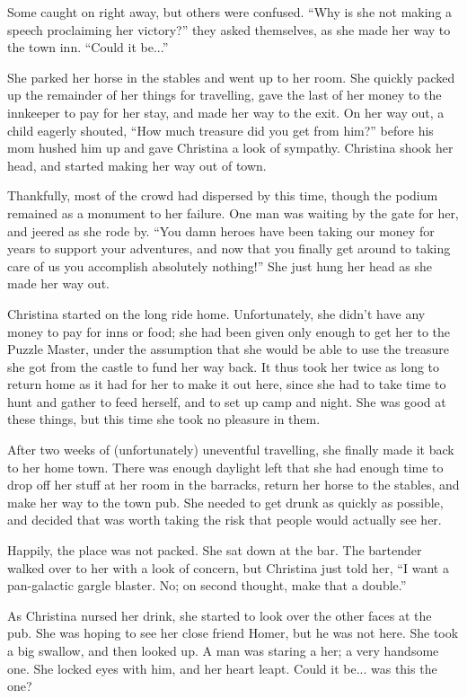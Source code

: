 \documentclass[showtrims,b6paper,draft,10pt]{memoir}
\begin{document}
Some caught on right away, but others were confused.  ``Why is she not making a speech proclaiming her victory?'' they asked themselves, as she made her way to the town inn.  ``Could it be...''

She parked her horse in the stables and went up to her room.  She quickly packed up the remainder of her things for travelling, gave the last of her money to the innkeeper to pay for her stay, and made her way to the exit.  On her way out, a child eagerly shouted, ``How much treasure did you get from him?'' before his mom hushed him up and gave Christina a look of sympathy.  Christina shook her head, and started making her way out of town.

Thankfully, most of the crowd had dispersed by this time, though the podium remained as a monument to her failure.  One man was waiting by the gate for her, and jeered as she rode by. ``You damn heroes have been taking our money for years to support your adventures, and now that you finally get around to taking care of us you accomplish absolutely nothing!''  She just hung her head as she made her way out.

\timeskip
Christina started on the long ride home.  Unfortunately, she didn't have any money to pay for inns or food;  she had been given only enough to get her to the Puzzle Master, under the assumption that she would be able to use the treasure she got from the castle to fund her way back.  It thus took her twice as long to return home as it had for her to make it out here, since she had to take time to hunt and gather to feed herself, and to set up camp and night.  She was good at these things, but this time she took no pleasure in them.

After two weeks of (unfortunately) uneventful travelling, she finally made it back to her home town.  There was enough daylight left that she had enough time to drop off her stuff at her room in the barracks, return her horse to the stables, and make her way to the town pub.  She needed to get drunk as quickly as possible, and decided that was worth taking the risk that people would actually see her.

Happily, the place was not packed.  She sat down at the bar.  The bartender walked over to her with a look of concern, but Christina just told her, ``I want a pan-galactic gargle blaster.  No; on second thought, make that a double.''

As Christina nursed her drink, she started to look over the other faces at the pub.  She was hoping to see her close friend Homer, but he was not here.  She took a big swallow, and then looked up.  A man was staring a her;  a very handsome one.  She locked eyes with him, and her heart leapt.  Could it be... was this the one?
\end{document}
